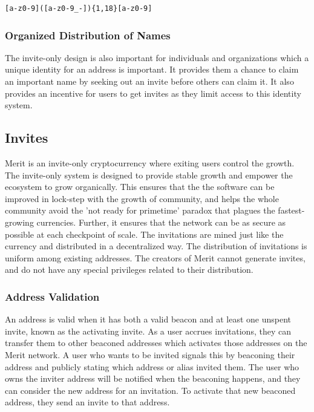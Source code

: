 \documentclass{article}
\begin{document}
\lstset{language=C}
\begin{lstlisting}[caption=Alias Validation Regex]
            [a-z0-9]([a-z0-9_-]){1,18}[a-z0-9]
\end{lstlisting}

\subsubsection{Organized Distribution of Names}

The invite-only design is also important for individuals and organizations
which a unique identity for an address is important. It provides them a chance to
claim an important name by seeking out an invite before others can claim it. 
It also provides an incentive for users to get invites as they limit access 
to this identity system.

\subsection{Invites}

Merit is an invite-only cryptocurrency where exiting users control the growth.
The invite-only system is designed to provide stable growth and empower the ecosystem 
to grow organically.  This ensures that the the software can be improved in lock-step 
with the growth of community, and helps the whole community avoid the 'not ready for primetime'
paradox that plagues the fastest-growing currencies. Further, it ensures that the network 
can be as secure as possible at each checkpoint of scale. The invitations are mined just like
the currency and distributed in a decentralized way. The distribution of
invitations is uniform among existing addresses. The creators of Merit cannot
generate invites, and do not have any special privileges related to their
distribution.

\subsubsection{Address Validation}

An address is valid when it has both a valid beacon and at least one unspent invite, known as the activating invite.
As a user accrues invitations, they can transfer them to other beaconed addresses
which activates those addresses on the Merit network. A user who wants to be invited signals
this by beaconing their address and publicly stating which address or alias invited them. The user who owns the
inviter address will be notified when the beaconing happens, and they can consider
the new address for an invitation. To activate that new beaconed address, they send
an invite to that address.
\end{document}
